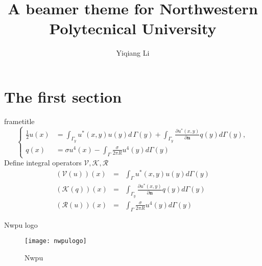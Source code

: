 \documentclass[xetex,10pt]{beamer}
\title[NPU theme]{A beamer theme for Northwestern Polytecnical University }
\author[Y. Li]{Yiqiang Li}
\institute[Dept. Applied Math.]{Department of Applied Mathmethics}
\date{}
\begin{document}
\begin{frame}[t]
\titlepage
\end{frame}

\section{The first section}
\begin{frame}[t]{frametitle}
	\begin{equation}
		\left\{
		\begin{aligned}
			\frac{1}{2}u(x) &= \int_{\Gamma_y}u^*(x,y)u(y) d\,\Gamma (y) + \int_{\Gamma_y} \frac{\partial u^*(x,y)}{\partial \mathbf{n}} q(y) d \Gamma(y), \\
			q(x) &= \sigma u^4(x) - \int_\Gamma \frac{\sigma}{2 \pi R} u^4(y) d\Gamma(y)
		\end{aligned}
		\right.
	\end{equation}
	Define integral operators $\mathcal{V},\mathcal{K},\mathcal{R}$
		\begin{eqnarray*}
			(\mathcal{V}(u))(x) &=& \int_\Gamma u^*(x,y)u(y) d\Gamma(y) \\
			(\mathcal{K}(q))(x) &=& \int_{\Gamma_y} \frac{\partial u^*(x,y)}{\partial \mathbf{n}} q(y) d \Gamma(y) \\
			(\mathcal{R}(u))(x) &=& \int_\Gamma \frac{\sigma}{2 \pi R} u^4(y) d\Gamma(y)
		\end{eqnarray*}
\end{frame}
\begin{frame}[t]{Nwpu logo}
	\begin{figure}[htbp]
		\begin{center}
			\texttt{[image: nwpulogo]}
		\end{center}
		\caption{Nwpu}
		\label{fig:nwpu}
	\end{figure}
	
\end{frame}
\end{document}
